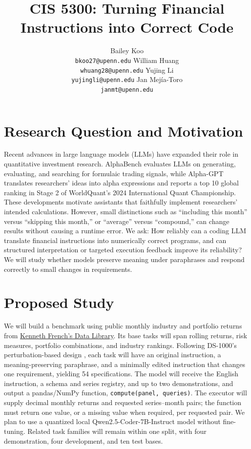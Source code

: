 \documentclass{article}
\title{CIS 5300: Turning Financial Instructions into Correct Code}
\author{Bailey Koo \\
\texttt{bkoo27@upenn.edu}
\And
William Huang \\
\texttt{whuang28@upenn.edu}
\AND
Yujing Li \\
\texttt{yujingli@upenn.edu} 
\And
Jan Mej\'{i}a-Toro \\
\texttt{janmt@upenn.edu}
}
\begin{document}
\maketitle
{}

\section{Research Question and Motivation}

Recent advances in large language models (LLMs) have expanded
their role in quantitative investment research.
AlphaBench \citep{luo2026alphabench} evaluates LLMs on generating,
evaluating, and searching for formulaic trading signals, while
Alpha-GPT \citep{wang2025alphagpt} translates researchers' ideas
into alpha expressions and reports a top 10 global ranking in
Stage 2 of WorldQuant's 2024 International Quant Championship.
These developments motivate assistants that faithfully implement
researchers' intended calculations. However, small distinctions such as
``including this month'' versus ``skipping this month,'' or
``average'' versus ``compound,'' can change results without
causing a runtime error. We ask:
How reliably can a coding LLM translate financial
instructions into numerically correct programs, and can
structured interpretation or targeted execution feedback improve
its reliability?
We will study whether models preserve meaning under paraphrases
and respond correctly to small changes in requirements.

\section{Proposed Study}

We will build a benchmark using public monthly industry and
portfolio returns from
\href{https://mba.tuck.dartmouth.edu/pages/faculty/ken.french/data_library.html}
{Kenneth French's Data Library}.
Its base tasks will span rolling returns, risk measures,
portfolio combinations, and industry rankings. Following
DS-1000's perturbation-based design \citep{lai2023ds1000},
each task will have an original instruction, a meaning-preserving
paraphrase, and a minimally edited instruction that changes one
requirement, yielding 54 specifications. The model will receive
the English instruction, a schema and series registry, and up to
two demonstrations, and output a pandas/NumPy function,
\texttt{compute(panel, queries)}. The executor will supply decimal
monthly returns and requested series--month pairs; the function
must return one value, or a missing value when required, per
requested pair. We plan to use a quantized local
Qwen2.5-Coder-7B-Instruct model without fine-tuning. Related task
families will remain within one split, with four demonstration,
four development, and ten test bases.
\end{document}
